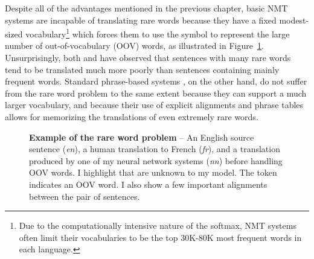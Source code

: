 Despite all of the advantages mentioned in the previous chapter, basic NMT systems are incapable of translating rare 
words because they have a fixed modest-sized vocabulary\footnote{ Due to the computationally intensive nature of the softmax, NMT systems often limit 
their vocabularies to be the top 30K-80K most frequent words in each language.}
which forces them to use the \unksym{} symbol to 
represent the large number of out-of-vocabulary (OOV) words, as illustrated in Figure~\ref{f:sent_pair}.
Unsurprisingly, both  and  have
observed that sentences with many rare words tend to be translated much more poorly than sentences
containing mainly frequent words.
Standard phrase-based systems \cite{koehn2007moses,chiang07hiero,cer10phrasal,dyer10cdec}, 
on the other hand, do not suffer from the rare word 
problem to the same extent because they can support a much larger vocabulary, 
and because their use of explicit alignments
and phrase tables allows for memorizing the translations 
of even extremely rare words. 

\begin{figure}
\caption[Example of the rare word problem]{{\bf Example of the rare word problem} -- An English source sentence ({\it en}), a human translation to French ({\it fr}), and a translation produced by one of my neural network systems ({\it nn}) before handling OOV words. I highlight  that are unknown to my model. 
The token \unksym{} indicates an OOV word. 
I also show a few important alignments between the pair of sentences. 
}
\label{f:sent_pair}
\end{figure}

